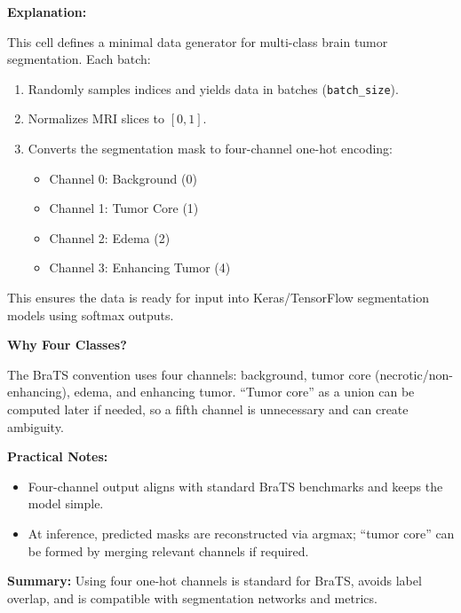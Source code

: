 \noindent\textbf{Explanation:}

This cell defines a minimal data generator for multi-class brain tumor segmentation. Each batch:
\begin{enumerate}
    \item Randomly samples indices and yields data in batches (\texttt{batch\_size}).
    \item Normalizes MRI slices to $[0,1]$.
    \item Converts the segmentation mask to four-channel one-hot encoding:
        \begin{itemize}
            \item Channel 0: Background (0)
            \item Channel 1: Tumor Core (1)
            \item Channel 2: Edema (2)
            \item Channel 3: Enhancing Tumor (4)
        \end{itemize}
\end{enumerate}
This ensures the data is ready for input into Keras/TensorFlow segmentation models using softmax outputs.

\noindent\textbf{Why Four Classes?}

The BraTS convention uses four channels: background, tumor core (necrotic/non-enhancing), edema, and enhancing tumor. ``Tumor core'' as a union can be computed later if needed, so a fifth channel is unnecessary and can create ambiguity.

\noindent\textbf{Practical Notes:}
\begin{itemize}
    \item Four-channel output aligns with standard BraTS benchmarks and keeps the model simple.
    \item At inference, predicted masks are reconstructed via argmax; ``tumor core'' can be formed by merging relevant channels if required.
\end{itemize}

\noindent\textbf{Summary:}
Using four one-hot channels is standard for BraTS, avoids label overlap, and is compatible with segmentation networks and metrics.

